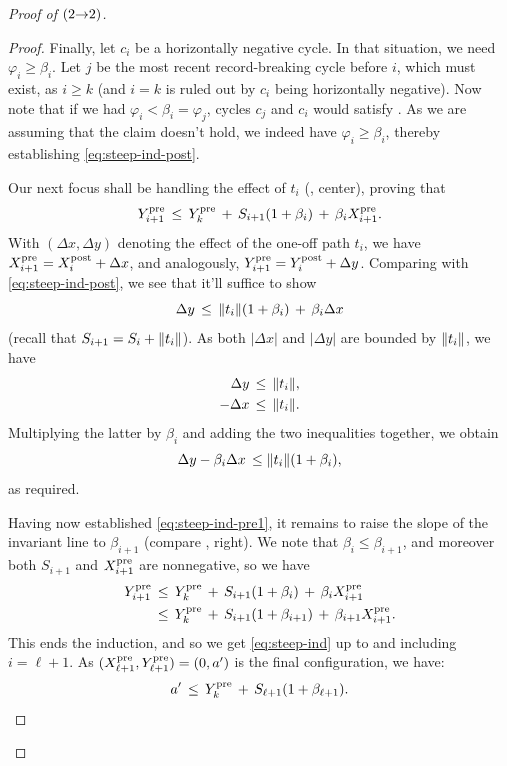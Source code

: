 \begin{proof}[Proof of  $({2}{\rightarrow}{2})$]
\begin{proof}
Finally, let $c_i$ be a horizontally negative cycle. In that situation, we need
$\varphi_i \geq \beta_i$.
Let $j$ be the most recent record-breaking cycle before $i$, which must
exist, as $i \geq k$ (and $i = k$ is ruled out by $c_i$ being horizontally negative).
Now note that if we had $\varphi_i < \beta_i = \varphi_j$, cycles $c_j$ and $c_i$
would satisfy . As we are assuming that the claim doesn't hold,
we indeed have $\varphi_i \geq \beta_i$, thereby establishing \eqref{eq:steep-ind-post}.

Our next focus shall be handling the effect of $t_i$ (, center), proving that
\begin{equation} \label{eq:steep-ind-pre1}
    Y^{\mathrm{pre}}_{i+1} \, \leq \, Y^{\mathrm{pre}}_k \, + \, S_{i+1} (1 + \beta_i) \, + \, \beta_i X^{\mathrm{pre}}_{i+1}.
\end{equation}
With $(\Delta x, \Delta y)$ denoting the effect of the one-off path $t_i$,
we have $X^{\mathrm{pre}}_{i+1} = X^{\mathrm{post}}_i + \Delta x$, and analogously,
$Y^{\mathrm{pre}}_{i+1} = Y^{\mathrm{post}}_i + \Delta y$. Comparing with \eqref{eq:steep-ind-post}, we
see that it'll suffice to show
\[
    \Delta y \, \leq \, \lVert t_i\rVert (1 + \beta_i) \, + \, \beta_i \Delta x
\]
(recall that $S_{i+1} = S_i + \lVert t_i\rVert$). As both $|\Delta x|$ and $|\Delta y|$
are bounded by $\lVert t_i\rVert$, we have
\begin{align*}
    \Delta y \, &\leq \, \lVert t_i\rVert, \\
    - \Delta x \, &\leq \, \lVert t_i\rVert.
\end{align*}
Multiplying the latter by $\beta_i$ and adding the two inequalities together,
we obtain
\[
    \Delta y - \beta_i \Delta x \, \leq \lVert t_i\rVert (1 + \beta_i),
\]
as required.

Having now established \eqref{eq:steep-ind-pre1}, it
remains to raise the slope of the invariant line to $\beta_{i+1}$
(compare , right).
We note that
$\beta_i \leq \beta_{i+1}$, and moreover both
$S_{i+1}$ and $X^{\mathrm{pre}}_{i+1}$ are nonnegative, so we have
\[
    \begin{split}
        Y^{\mathrm{pre}}_{i+1} \, &\leq \, Y^{\mathrm{pre}}_k \, + \, S_{i+1} (1 + \beta_i) \, + \, \beta_i X^{\mathrm{pre}}_{i+1}
    \\
        &\leq \, Y^{\mathrm{pre}}_k \, + \, S_{i+1} (1 + \beta_{i+1}) \, + \, \beta_{i+1} X^{\mathrm{pre}}_{i+1}.
    \end{split}
\]
This ends the induction, and so we get \eqref{eq:steep-ind} up to and including $i = \ell + 1$.
As $(X^{\mathrm{pre}}_{\ell + 1}, Y^{\mathrm{pre}}_{\ell + 1}) = (0, a')$ is the final configuration, we have:
\[
    a' \, \leq \, Y^{\mathrm{pre}}_k \, + \, S_{\ell + 1} (1 + \beta_{\ell + 1}).
\]


\end{proof}
\end{proof}
